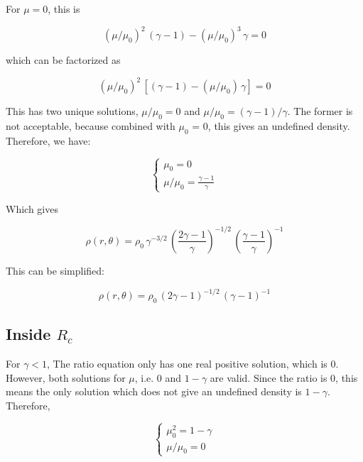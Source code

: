 \documentclass[11pt]{article}
\begin{document}
For $\mu=0$, this is 

\begin{equation}
\left(\mu/\mu_0\right)^2\,(\gamma - 1) - \left(\mu/\mu_0\right)^3\,\gamma = 0
\end{equation}

which can be factorized as

\begin{equation}
\left(\mu/\mu_0\right)^2\,\left[(\gamma - 1) - \left(\mu/\mu_0\right)\,\gamma\right] = 0
\end{equation}

This has two unique solutions, $\mu/\mu_0=0$ and $\mu/\mu_0 = (\gamma - 1)/\gamma$. The former is not acceptable, because combined with $\mu_0$ = 0, this gives an undefined density. Therefore, we have:

\begin{equation}
\left\{\begin{array}{l}\mu_0 = 0 \\\displaystyle\mu/\mu_0 = \frac{\gamma - 1}{\gamma}\end{array}\right.\end{equation}

Which gives

\begin{equation}
\rho(r, \theta) = \rho_0\,\gamma^{-3/2}\,\left(\frac{2\gamma-1}{\gamma}\right)^{-1/2} \, \left(\frac{\gamma-1}{\gamma}\right)^{-1}
\end{equation}

This can be simplified:

\begin{equation}
\rho(r, \theta) = \rho_0\,(2\gamma-1)^{-1/2} \,(\gamma-1)^{-1}
\end{equation}


\subsection{Inside $R_c$}

For $\gamma < 1$, The ratio equation only has one real positive solution, which is 0. However, both solutions for $\mu$, i.e. 0 and $1-\gamma$ are valid. Since the ratio is 0, this means the only solution which does not give an undefined density is $1-\gamma$. Therefore, 

\begin{equation}
\left\{\begin{array}{l}\mu_0^2 = 1-\gamma \\\displaystyle\mu/\mu_0 = 0\end{array}\right.\end{equation}
\end{document}
